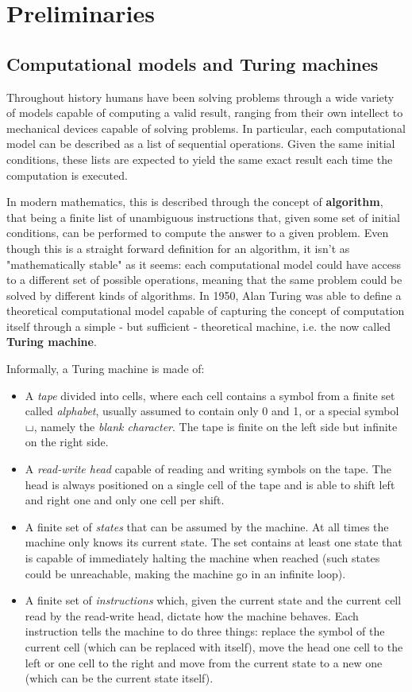 
\chapter{Preliminaries} \label{chap:preliminaries}

\section{Computational models and Turing machines}

Throughout history humans have been solving problems through a wide variety of models capable of computing a valid result, ranging from their own intellect to mechanical devices capable of solving problems. In particular, each computational model can be described as a list of sequential operations. Given the same initial conditions, these lists are expected to yield the same exact result each time the computation is executed.

In modern mathematics, this is described through the concept of \textbf{algorithm}, that being a finite list of unambiguous instructions that, given some set of initial conditions, can be performed to compute the answer to a given problem. Even though this is a straight forward definition for an algorithm, it isn't as "mathematically stable" as it seems: each computational model could have access to a different set of possible operations, meaning that the same problem could be solved by different kinds of algorithms. In 1950, Alan Turing was able to define a theoretical computational model capable of capturing the concept of computation itself through a simple - but sufficient - theoretical machine, i.e. the now called \textbf{Turing machine}.

Informally, a Turing machine is made of:
\begin{itemize}
    \item A \textit{tape} divided into cells, where each cell contains a symbol from a finite set called \textit{alphabet}, usually assumed to contain only 0 and 1, or a special symbol $\blankchar$, namely the \textit{blank character}. The tape is finite on the left side but infinite on the right side. 
    \item A \textit{read-write head} capable of reading and writing symbols on the tape. The head is always positioned on a single cell of the tape and is able to shift left and right one and only one cell per shift.
    \item A finite set of \textit{states} that can be assumed by the machine. At all times the machine only knows its current state. The set contains at least one state that is capable of immediately halting the machine when reached (such states could be unreachable, making the machine go in an infinite loop).
    \item A finite set of \textit{instructions} which, given the current state and the current cell read by the read-write head, dictate how the machine behaves. Each instruction tells the machine to do three things: replace the symbol of the current cell (which can be replaced with itself), move the head one cell to the left or one cell to the right and move from the current state to a new one (which can be the current state itself).
\end{itemize}

